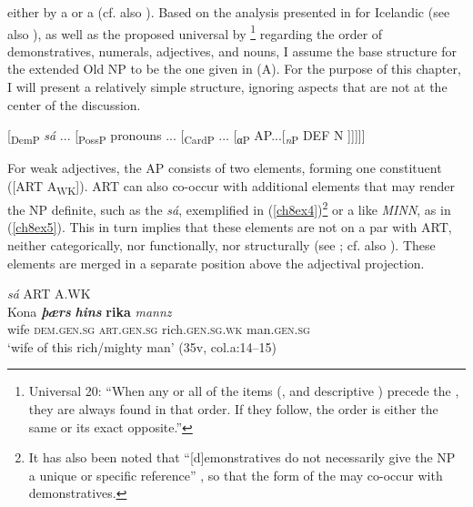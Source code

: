 \documentclass[output=paper,colorlinks,citecolor=brown]{langscibook}
\begin{document}
either by a  or a  (cf. also \citealp{LanderHaegeman2014}). Based on the analysis presented in \citet{Pfaff2019} for Icelandic
(see also \citealp{Hardarson2017}), as well as the proposed universal by \citet[87]{Greenberg63}\footnote{Universal 20: ``When any or all of the
  items (,  and descriptive ) precede the
  , they are always found in that order. If they follow, the order
  is either the same or its exact opposite.''} regarding the order of
demonstratives, numerals, adjectives, and nouns, I assume the base
structure for the extended Old  NP to be the one given in (A).
For the purpose of this chapter, I will present a relatively simple
structure, ignoring aspects that are not at the center of the
discussion.

\begin{exe}\label{ch8exa}
  {[}\textsubscript{DemP} \emph{sá} ... {[}\textsubscript{PossP} pronouns ... {[}\textsubscript{CardP} ... {[}\textsubscript{αP} AP...{[}\textsubscript{\emph{n}P} DEF N {]}{]}{]}{]}{]}
\end{exe}

For weak adjectives, the AP consists of two elements, forming one
constituent ({[}ART A\textsubscript{WK}{]}). ART can also co-occur
with additional elements that may render the NP definite, such as the
 \emph{sá}, exemplified in (\ref{ch8ex4})\footnote{It has also been
  noted that ``{[}d{]}emonstratives do not necessarily give the NP a
  unique or specific reference'' \citep[85f]{Faarlund04}, so that the
   form of the  may co-occur with demonstratives.}
or a  like \emph{MINN}, as in (\ref{ch8ex5}). This in turn
implies that these elements are not on a par with ART, neither categorically, nor functionally, nor structurally (see \citealp[24, 31f]{Pfaff2019}; cf. also \citealp{Faarlund04,Faarlund2009}). These elements are merged in a separate
position above the adjectival projection.

\begin{exe} 
\ex \label{ch8ex4}\emph{sá} ART A.WK\\
\gll Kona \textbf{\textit{þærs}} \textbf{\textit{hins}} \textbf{rika} \textit{mannz} \\
wife \textsc{dem.gen.sg} \textsc{art.gen.sg} rich.\textsc{gen.sg.wk} man.\textsc{gen.sg}\\
\glt `wife of this rich/mighty man' (35v, col.a:14--15)
\end{exe}
\end{document}
